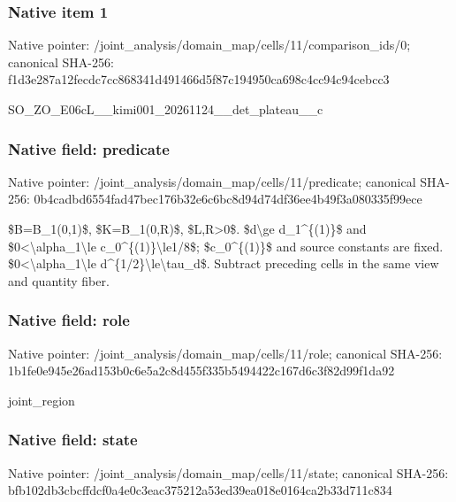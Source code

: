 \documentclass[10pt,a4paper]{article}
\begin{document}
\subsubsection{Native item 1}


Native pointer: /joint\_analysis/domain\_m\allowbreak{}ap/cells/11/comparison\_i\allowbreak{}ds/0; canonical SHA-256: f1d3e287a12fecdc7cc86834\allowbreak{}1d491466d5f87c194950ca69\allowbreak{}8c4cc94c94cebcc3


SO\_ZO\_E06cL\_\_kimi001\_202\allowbreak{}61124\_\_det\_plateau\_\_c


\subsubsection{Native field: predicate}


Native pointer: /joint\_analysis/domain\_m\allowbreak{}ap/cells/11/predicate; canonical SHA-256: 0b4cadbd6554fad47bec176b\allowbreak{}32e6c6bc8d94d74df36ee4b4\allowbreak{}9f3a080335f99ece


\$B=B\_1(0,1)\$, \$K=B\_1(0,R)\$, \$L,R>0\$. \$d\textbackslash{}ge d\_1\textasciicircum{}\{(1)\}\$ and \$0<\textbackslash{}alpha\_1\textbackslash{}le c\_0\textasciicircum{}\{(1)\}\textbackslash{}le1/8\$; \$c\_0\textasciicircum{}\{(1)\}\$ and source constants are fixed. \$0<\textbackslash{}alpha\_1\textbackslash{}le d\textasciicircum{}\{1/2\}\textbackslash{}le\textbackslash{}tau\_d\$. Subtract preceding cells in the same view and quantity fiber.


\subsubsection{Native field: role}


Native pointer: /joint\_analysis/domain\_m\allowbreak{}ap/cells/11/role; canonical SHA-256: 1b1fe0e945e26ad153b0c6e5\allowbreak{}a2c8d455f335b5494422c167\allowbreak{}d6c3f82d99f1da92


joint\_region


\subsubsection{Native field: state}


Native pointer: /joint\_analysis/domain\_m\allowbreak{}ap/cells/11/state; canonical SHA-256: bfb102db3cbcffdcf0a4e0c3\allowbreak{}eac375212a53ed39ea018e01\allowbreak{}64ca2b33d711c834
\end{document}
